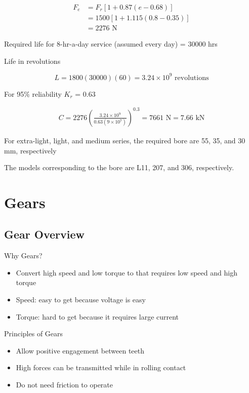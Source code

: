 \documentclass[a4paper,openany]{tufte-book}
\begin{document}
\begin{align*}
  F_{e} &= F_r \left[ 1 + 0.87(e - 0.68) \right] \\
        &= 1500 \left[ 1 + 1.115(0.8 - 0.35) \right] \\
        &= 2276 \text{ N}
\end{align*}

Required life for 8-hr-a-day service (assumed every day) = 30000 hrs

Life in revolutions

\[L = 1800(30000)(60) = 3.24 \times 10^9 \text{ revolutions}\]

For 95\% reliability \(K_r\) = 0.63

\begin{align*}
    C = 2276 \left( \frac{3.24 \times 10^9}{0.63 (9 \times 10^7)} \right)^{0.3} = 7661 \text{ N} = 7.66 \text{ kN}
\end{align*}

For extra-light, light, and medium series, the required bore are 55, 35,
and 30 mm, respectively

The models corresponding to the bore are L11, 207, and 306,
respectively.

\chapter{Gears}
\label{sec:orge3cf2b8}
\section{Gear Overview}
\label{sec:org767dbe7}

Why Gears?

\begin{itemize}
\item Convert high speed and low torque to that requires low speed and high
torque

\item Speed: easy to get because voltage is easy

\item Torque: hard to get because it requires large current
\end{itemize}

Principles of Gears

\begin{itemize}
\item Allow positive engagement between teeth

\item High forces can be transmitted while in rolling contact

\item Do not need friction to operate
\end{itemize}
\end{document}
